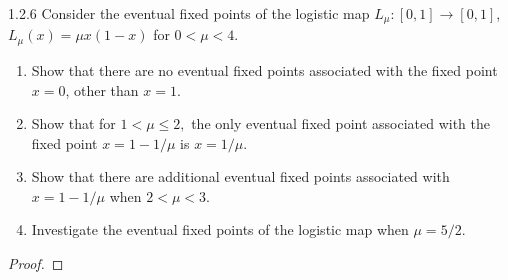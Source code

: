 \begin{problem}{1.2.6}
  Consider the eventual fixed points of the logistic map $L_{\mu}: [0,1] \to [0,1]$,
  $L_\mu(x)  = \mu x (1-x)$ for $0 < \mu < 4$.
  \begin{enumerate}
    \item Show that there are no eventual fixed points associated with the fixed
      point $x=0$, other than $x=1$.
    \item Show that for $1 < \mu \leq 2,$ the only eventual fixed point associated
      with the fixed point $x = 1 - 1/\mu$ is $x = 1/\mu$.
    \item Show that there are additional eventual fixed points associated with $x = 1 - 1/\mu$
      when $2 < \mu < 3$.
    \item Investigate the eventual fixed points of the logistic map when $\mu = 5/2$.
  \end{enumerate}
\end{problem}

\begin{proof}

\end{proof}
\newpage
